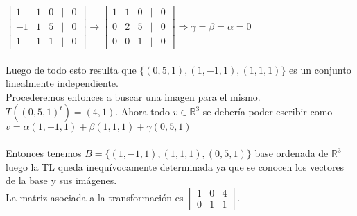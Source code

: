 \documentclass{article}
\begin{document}
$\begin{bmatrix} 1&1&0&|&0\\-1&1&5&|&0\\1&1&1&|&0 \end{bmatrix} \rightarrow 
\begin{bmatrix} 1&1&0&|&0\\0&2&5&|&0\\0&0&1&|&0 \end{bmatrix} \Rightarrow \gamma=\beta=\alpha=0$ 
\\ \\
Luego de todo esto resulta que $\{(0,5,1),(1,-1,1),(1,1,1)\}$ es un conjunto linealmente independiente.
\\ Procederemos entonces a buscar una imagen para el mismo.
\\ $T((0,5,1)^t) = (4,1)$.
Ahora todo $v \in \mathbb{R}^3$ se debería poder escribir como $v = \alpha(1,-1,1)+\beta(1,1,1)+\gamma(0,5,1)$
\\ \\ Entonces tenemos $B = \{ (1,-1,1),(1,1,1),(0,5,1) \}$ base ordenada de $\mathbb{R}^3$ luego la TL queda 
inequívocamente determinada ya que se conocen los vectores de la base y sus imágenes. \\
La matriz asociada a la transformación es $\begin{bmatrix} 1&0&4\\0&1&1  \end{bmatrix}$.
\end{document}
